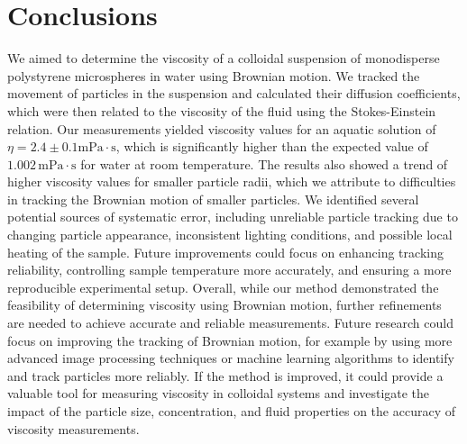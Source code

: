 \documentclass[twocolumn,a4paper,aps,amsmath,amssymb,floatfix,superscriptaddress]{revtex4-2}
\begin{document}
\section{Conclusions}\label{conclusions}
    We aimed to determine the viscosity of a colloidal suspension of monodisperse polystyrene microspheres in water using Brownian motion. We tracked the movement of particles in the suspension and calculated their diffusion coefficients, which were then related to the viscosity of the fluid using the Stokes-Einstein relation. Our measurements yielded viscosity values for an aquatic solution of $\eta=2.4\pm 0.1\text{mPa}\cdot \text{s}$, which is significantly higher than the expected value of $1.002 \, \text{mPa}\cdot\text{s}$ for water at room temperature. The results also showed a trend of higher viscosity values for smaller particle radii, which we attribute to difficulties in tracking the Brownian motion of smaller particles. We identified several potential sources of systematic error, including unreliable particle tracking due to changing particle appearance, inconsistent lighting conditions, and possible local heating of the sample. Future improvements could focus on enhancing tracking reliability, controlling sample temperature more accurately, and ensuring a more reproducible experimental setup. Overall, while our method demonstrated the feasibility of determining viscosity using Brownian motion, further refinements are needed to achieve accurate and reliable measurements.
    Future research could focus on improving the tracking of Brownian motion, for example by using more advanced image processing techniques or machine learning algorithms to identify and track particles more reliably. If the method is improved, it could provide a valuable tool for measuring viscosity in colloidal systems and investigate the impact of the particle size, concentration, and fluid properties on the accuracy of viscosity measurements.



\end{document}
